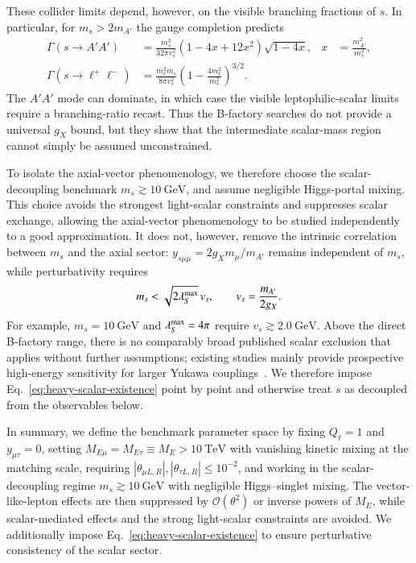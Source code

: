 \documentclass[onecolumn, aps, nofootinbib, prd, preprint, floats, floatfix, amsmath, amssymb, superscriptaddress, preprintnumbers]{revtex4-2}
\begin{document}
These collider limits depend, however, on the visible branching fractions of $s$. In particular, for $m_s>2m_{A'}$ the gauge completion predicts
\begin{equation}
\begin{aligned}
\Gamma(s\to A'A')&=\frac{m_s^3}{32\pi v_s^2}
\left(1-4x+12x^2\right)\sqrt{1-4x},
&x&=\frac{m_{A'}^2}{m_s^2},\\
\Gamma(s\to\ell^+\ell^-)&=\frac{m_\ell^2m_s}{8\pi v_s^2}
\left(1-\frac{4m_\ell^2}{m_s^2}\right)^{3/2}.
\end{aligned}
\label{eq:scalar-partial-widths}
\end{equation}
The $A'A'$ mode can dominate, in which case the visible leptophilic-scalar limits require a branching-ratio recast. Thus the B-factory searches do not provide a universal $g_X$ bound, but they show that the intermediate scalar-mass region cannot simply be assumed unconstrained.

To isolate the axial-vector phenomenology, we therefore choose the scalar-decoupling benchmark $m_s\gtrsim10~\mathrm{GeV}$, 
and assume negligible Higgs-portal mixing. This choice avoids the strongest light-scalar constraints and suppresses scalar exchange, allowing the axial-vector phenomenology to be studied independently to a good approximation. It does not, however, remove the intrinsic correlation between $m_s$ and the axial sector: $y_{s\mu\mu}=2g_Xm_\mu/m_{A'}$ remains independent of $m_s$, while perturbativity requires
\begin{equation}
m_s<\sqrt{2\lambda_S^{\rm max}}\,v_s,
\qquad v_s=\frac{m_{A'}}{2g_X}.
\label{eq:heavy-scalar-existence}
\end{equation}
For example, $m_s=10~\mathrm{GeV}$ and $\lambda_S^{\rm max}=4\pi$ require $v_s\gtrsim2.0~\mathrm{GeV}$. Above the direct B-factory range, there is no comparably broad published scalar exclusion that applies without further assumptions; existing studies mainly provide prospective high-energy sensitivity for larger Yukawa couplings~\cite{Chen:2021leptophilic}. We therefore impose Eq.~\eqref{eq:heavy-scalar-existence} point by point and otherwise treat $s$ as decoupled from the observables below.

In summary, we define the benchmark parameter space by fixing $Q_\ell=1$ and $y_{\mu\tau}=0$, setting $M_{E\mu}=M_{E\tau}\equiv M_E>10~\mathrm{TeV}$ with vanishing kinetic mixing at the matching scale, requiring $|\theta_{\mu L,R}|,|\theta_{\tau L,R}|\leq10^{-2}$, and working in the scalar-decoupling regime $m_s\gtrsim10~\mathrm{GeV}$ with negligible Higgs--singlet mixing. The vector-like-lepton effects are then suppressed by $\mathcal{O}(\theta^2)$ or inverse powers of $M_E$, while scalar-mediated effects and the strong light-scalar constraints are avoided. We additionally impose Eq.~\eqref{eq:heavy-scalar-existence} to ensure perturbative consistency of the scalar sector.
\end{document}
